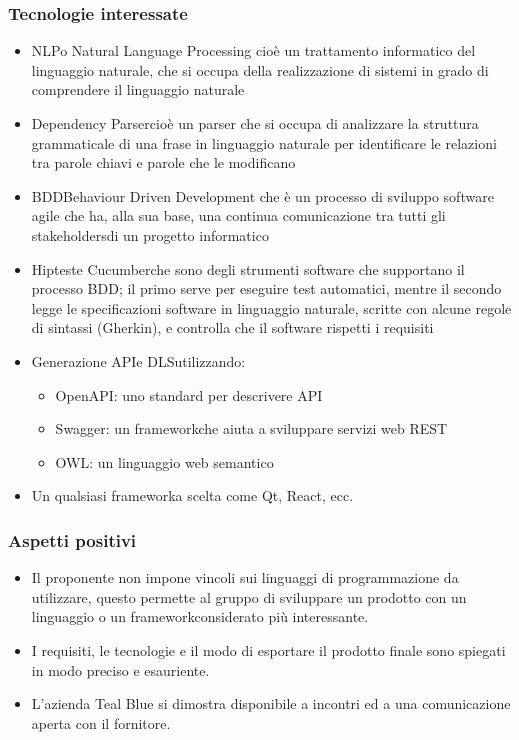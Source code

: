 \subsubsection{Tecnologie interessate}
\begin{itemize}
	\item NLP\glo o Natural Language Processing cioè un trattamento informatico del linguaggio naturale, che si occupa della realizzazione di sistemi in grado di comprendere il linguaggio naturale	
	\item Dependency Parser\glo cioè un parser che si occupa di analizzare la struttura grammaticale di una frase in linguaggio naturale per identificare le relazioni tra parole chiavi e parole che le modificano
	\item BDD\glo Behaviour Driven Development che è un processo di sviluppo software agile che ha, alla sua base, una continua comunicazione tra tutti gli stakeholders\glo di un progetto informatico
	\item Hiptest\glo e Cucumber\glo che sono degli strumenti software che supportano il processo BDD\glo; il primo serve per eseguire test automatici, mentre il secondo legge le specificazioni software in linguaggio naturale, scritte con alcune regole di sintassi (Gherkin\glo), e controlla che il software rispetti i requisiti
	\item Generazione API\glo e DLS\glo utilizzando:
	\begin{itemize}
		\item OpenAPI\glo: uno standard per descrivere API\glo
		\item Swagger\glo: un framework\glo che aiuta a sviluppare servizi web REST\glo
		\item OWL\glo: un linguaggio web semantico
	\end{itemize}
	\item Un qualsiasi framework\glo a scelta come Qt\glo, React\glo, ecc.
\end{itemize} 
\subsubsection{Aspetti positivi}
\begin{itemize} 
	\item Il proponente non impone vincoli sui linguaggi di programmazione da utilizzare, questo permette  al gruppo di sviluppare un prodotto con un linguaggio o un framework\glo considerato più interessante. 
	\item I requisiti, le tecnologie e il modo di esportare il prodotto finale sono spiegati in modo preciso e esauriente.
	\item L'azienda Teal Blue si dimostra disponibile a incontri ed a una comunicazione aperta con il fornitore.
\end{itemize}
